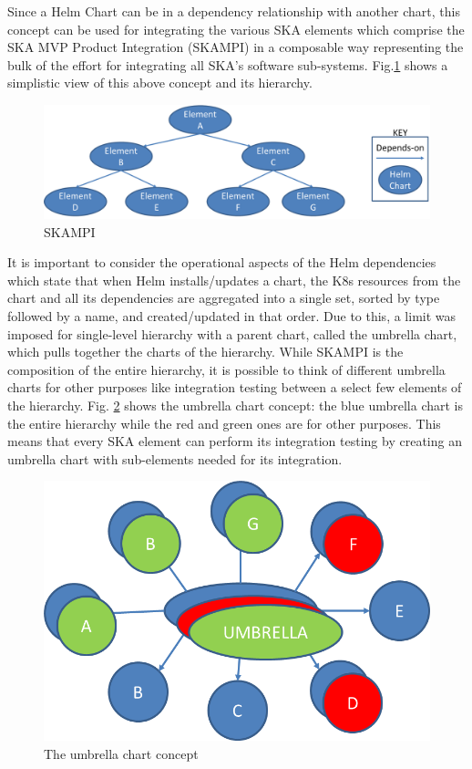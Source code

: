 \documentclass[a4paper,
	       keeplastbox,   %
	       References
	       ]{jacow}
\begin{document}
Since a Helm Chart can be in a dependency relationship with another chart, this concept can be used for integrating the various SKA elements which comprise the SKA MVP Product Integration (SKAMPI\cite{SKAMPI}) in a composable way representing the bulk of the effort for integrating all SKA's software sub-systems. Fig.\ref{fig:skampi} shows a simplistic view of this above concept and its hierarchy.

\begin{figure}[!htb]
	\centering
	\includegraphics*[width=0.8\columnwidth]{simple_skampi}
	\caption{SKAMPI}
	\label{fig:skampi}
\end{figure}

It is important to consider the operational aspects of the Helm dependencies which state that when Helm installs/updates a chart, the K8s resources from the chart and all its dependencies are aggregated into a single set, sorted by type followed by a name, and created/updated in that order. Due to this, a limit was imposed for single-level hierarchy with a parent chart, called the umbrella chart, which pulls together the charts of the hierarchy. While SKAMPI is the composition of the entire hierarchy, it is possible to think of different umbrella charts for other purposes like integration testing between a select few elements of the hierarchy. Fig. \ref{fig:umbrella_chart} shows the umbrella chart concept: the blue umbrella chart is the entire hierarchy while the red and green ones are for other purposes. This means that every SKA element can perform its integration testing by creating an umbrella chart with sub-elements needed for its integration.

\begin{figure}[!htb]
   \centering
   \includegraphics*[width=0.5\columnwidth]{umbrella_chart.png}
   \caption{The umbrella chart concept}
   \label{fig:umbrella_chart}
\end{figure}
\end{document}
